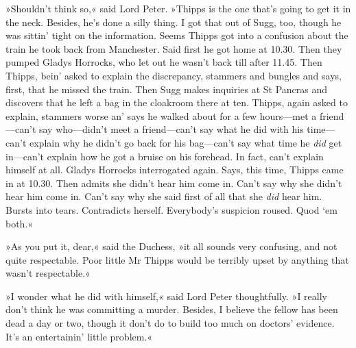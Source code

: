 »Shouldn't think so,« said Lord Peter. »Thipps is the one that's going to get it in the neck. Besides, he's done a silly thing. I got that out of Sugg, too, though he was sittin' tight on the information. Seems Thipps got into a confusion about the train he took back from Manchester. Said first he got home at 10.30. Then they pumped Gladys Horrocks, who let out he wasn't back till after 11.45. Then Thipps, bein' asked to explain the discrepancy, stammers and bungles and says, first, that he missed the train. Then Sugg makes inquiries at St Pancras and discovers that he left a bag in the cloakroom there at ten. Thipps, again asked to explain, stammers worse an' says he walked about for a few hours—met a friend—can't say who—didn't meet a friend—can't say what he did with his time—can't explain why he didn't go back for his bag—can't say what time he \textit{did} get in—can't explain how he got a bruise on his forehead. In fact, can't explain himself at all. Gladys Horrocks interrogated again. Says, this time, Thipps came in at 10.30. Then admits she didn't hear him come in. Can't say why she didn't hear him come in. Can't say why she said first of all that she \textit{did} hear him. Bursts into tears. Contradicts herself. Everybody's suspicion roused. Quod `em both.«

»As you put it, dear,« said the Duchess, »it all sounds very confusing, and not quite respectable. Poor little Mr Thipps would be terribly upset by anything that wasn't respectable.«

»I wonder what he did with himself,« said Lord Peter thoughtfully. »I really don't think he was committing a murder. Besides, I believe the fellow has been dead a day or two, though it don't do to build too much on doctors' evidence. It's an entertainin' little problem.«

